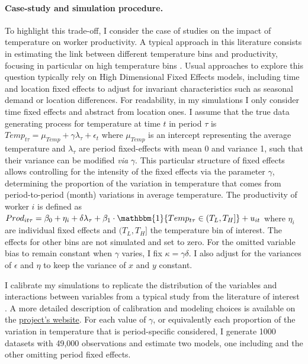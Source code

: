 \documentclass[usletter, 12pt]{article}
\begin{document}
			\paragraph{Case-study and simulation procedure.} To highlight this trade-off, I consider the case of studies on the impact of temperature on worker productivity. A typical approach in this literature consists in estimating the link between different temperature bins and productivity, focusing in particular on high temperature bins \citep[for a review of the literature]{lai_effects_2023}. Usual approaches to explore this question typically rely on High Dimensional Fixed Effects models, including time and location fixed effects to adjust for invariant characteristics such as seasonal demand or location differences. For readability, in my simulations I only consider time fixed effects and abstract from location ones. I assume that the true data generating process for temperature at time $t$ in period $\tau$ is $Temp_{t\tau} = \mu_{Temp} +  \gamma\lambda_{\tau} + \epsilon_{t}$ where $\mu_{Temp}$ is an intercept representing the average temperature and $\lambda_{\tau}$ are period fixed-effects with mean 0 and variance 1, such that their variance can be modified \textit{via} $\gamma$. This particular structure of fixed effects allows controlling for the intensity of the fixed effects via the parameter $\gamma$, determining the proportion of the variation in temperature that comes from period-to-period (month) variations in average temperature. The productivity of worker $i$ is defined as $Prod_{it\tau} = \beta_0 + \eta_i + \delta\lambda_{\tau} + \beta_1 \cdot \mathbbm{1}\{Temp_{t\tau} \in (T_L,T_H ] \} + u_{it}$ where $\eta_i$ are individual fixed effects and $(T_L,T_H ]$ the temperature bin of interest. The effects for other bins are  not simulated and set to zero. For the omitted variable bias to remain constant when $\gamma$ varies, I fix $\kappa = \gamma\delta$. I also adjust for the variances of $\epsilon$ and $\eta$ to keep the variance of $x$ and $y$ constant.
			
			I calibrate my simulations to replicate the distribution of the variables and interactions between variables from a typical study from the literature of interest \citep[among others]{stevens_temperature_2017,somanathan_impact_2021,lai_effects_2023,lopalo_temperature_2023}. A more detailed description of calibration and modeling choices is available on the \href{https://vincentbagilet.github.io/causal_exaggeration/FE.html}{project's website}. For each value of $\gamma$, or equivalently each proportion of the variation in temperature that is period-specific considered, I generate 1000 datasets with 49,000 observations and estimate two models, one including and the other omitting period fixed effects. %
				
\end{document}
